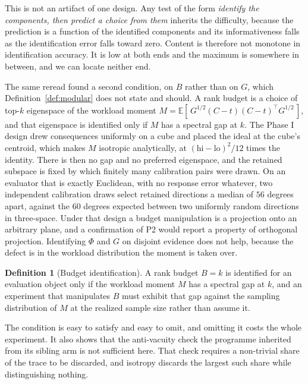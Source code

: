 \documentclass[11pt,letterpaper]{article}
\theoremstyle{plain}
\theoremstyle{definition}
\newtheorem{definition}[theorem]{Definition}
\newcommand{\Eb}{\mathbb{E}}
\begin{document}
This is not an artifact of one design. Any test of the form \emph{identify the
components, then predict a choice from them} inherits the difficulty, because
the prediction is a function of the identified components and its
informativeness falls as the identification error falls toward zero. Content is
therefore not monotone in identification accuracy. It is low at both ends and
the maximum is somewhere in between, and we can locate neither end.

The same reread found a second condition, on $B$ rather than on $G$, which
Definition~\ref{def:modular} does not state and should. A rank budget is a
choice of top-$k$ eigenspace of the workload moment
$M = \Eb[\,G^{1/2}(C-t)(C-t)^{\!\top} G^{1/2}\,]$, and that eigenspace is
identified only if $M$ has a spectral gap at $k$. The Phase I design drew
consequences uniformly on a cube and placed the ideal at the cube's centroid,
which makes $M$ isotropic analytically, at $(\mathrm{hi}-\mathrm{lo})^2/12$
times the identity. There is then no gap and no preferred eigenspace, and the
retained subspace is fixed by which finitely many calibration pairs were drawn.
On an evaluator that is exactly Euclidean, with no response error whatever, two
independent calibration draws select retained directions a median of $56$
degrees apart, against the $60$ degrees expected between two uniformly random
directions in three-space. Under that design a budget manipulation is a
projection onto an arbitrary plane, and a confirmation of P2 would report a
property of orthogonal projection. Identifying $\Phi$ and $G$ on disjoint
evidence does not help, because the defect is in the workload distribution the
moment is taken over.

\begin{definition}[Budget identification]
\label{def:gap}
A rank budget $B = k$ is identified for an evaluation object only if the
workload moment $M$ has a spectral gap at $k$, and an experiment that
manipulates $B$ must exhibit that gap against the sampling distribution of $M$
at the realized sample size rather than assume it.
\end{definition}

\noindent The condition is easy to satisfy and easy to omit, and omitting it
costs the whole experiment. It also shows that the anti-vacuity check the
programme inherited from its sibling arm is not sufficient here. That check
requires a non-trivial share of the trace to be discarded, and isotropy
discards the largest such share while distinguishing nothing.
\end{document}
